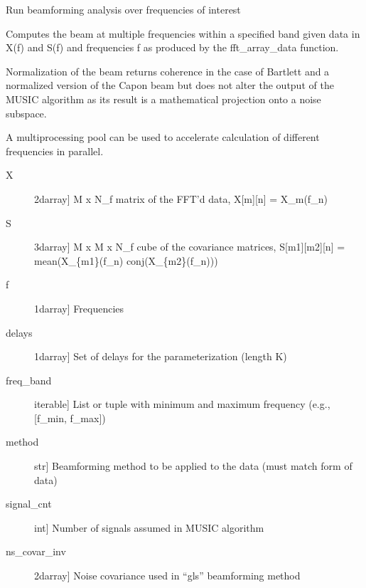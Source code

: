 \documentclass[letterpaper,10pt,english]{sphinxmanual}
\begin{document}
\begin{fulllineitems}
\label{\detokenize{infrapy.detection:infrapy.detection.beamforming_new.run}}
Run beamforming analysis over frequencies of interest

Computes the beam at multiple frequencies within a specified band given data in X(f)
and S(f) and frequencies f as produced by the fft\_array\_data function.

Normalization of the beam returns coherence in the case of Bartlett and a normalized
version of the Capon beam but does not alter the output of the MUSIC algorithm as
its result is a mathematical projection onto a noise subspace.

A multiprocessing pool can be used to accelerate calculation of different frequencies
in parallel.
\begin{description}
\item[{X}] \leavevmode{[}2darray{]}
M x N\_f matrix of the FFT’d data, X{[}m{]}{[}n{]} = X\_m(f\_n)

\item[{S}] \leavevmode{[}3darray{]}
M x M x N\_f cube of the covariance matrices, S{[}m1{]}{[}m2{]}{[}n{]} = mean(X\_\{m1\}(f\_n) conj(X\_\{m2\}(f\_n)))

\item[{f}] \leavevmode{[}1darray{]}
Frequencies

\item[{delays}] \leavevmode{[}1darray{]}
Set of delays for the parameterization (length K)

\item[{freq\_band}] \leavevmode{[}iterable{]}
List or tuple with minimum and maximum frequency (e.g.,  {[}f\_min, f\_max{]})

\item[{method}] \leavevmode{[}str{]}
Beamforming method to be applied to the data (must match form of data)

\item[{signal\_cnt}] \leavevmode{[}int{]}
Number of signals assumed in MUSIC algorithm

\item[{ns\_covar\_inv}] \leavevmode{[}2darray{]}
Noise covariance used in “gls” beamforming method


\end{description}
\end{fulllineitems}
\end{document}
